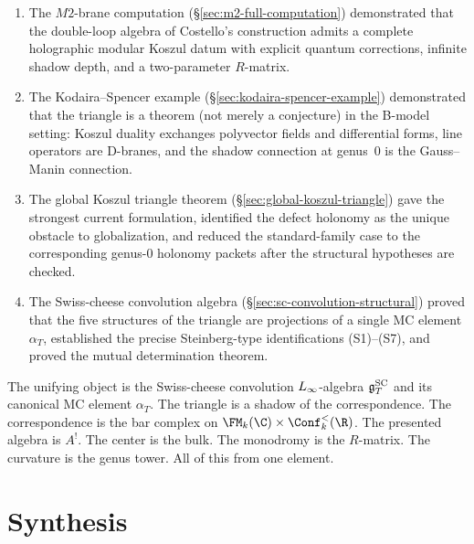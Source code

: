 \begin{enumerate}[label=(\arabic*),leftmargin=1.8em]
\item The $M2$-brane computation
(\S\ref{sec:m2-full-computation})
demonstrated that the double-loop algebra of Costello's
construction admits a complete holographic modular Koszul datum
with explicit quantum corrections, infinite shadow depth, and
a two-parameter $R$-matrix.

\item The Kodaira--Spencer example
(\S\ref{sec:kodaira-spencer-example})
demonstrated that the triangle is a theorem (not merely a
conjecture) in the B-model setting: Koszul duality exchanges
polyvector fields and differential forms, line operators are
D-branes, and the shadow connection at genus~$0$ is the
Gauss--Manin connection.

\item The global Koszul triangle theorem
(\S\ref{sec:global-koszul-triangle})
gave the strongest current formulation, identified the defect
holonomy as the unique obstacle to globalization, and reduced
the standard-family case to the corresponding genus-$0$
holonomy packets after the structural hypotheses are checked.

\item The Swiss-cheese convolution algebra
(\S\ref{sec:sc-convolution-structural})
proved that the five structures of the triangle are projections
of a single MC element $\alpha_T$, established the precise
Steinberg-type identifications (S1)--(S7), and proved the mutual
determination theorem.
\end{enumerate}

The unifying object is the Swiss-cheese convolution $L_\infty$-algebra
$\mathfrak{g}^{\mathrm{SC}}_T$ and its canonical MC element $\alpha_T$. The triangle
is a shadow of the correspondence. The correspondence is the
bar complex on $\FM_k(\C)\times\Conf_k^{<}(\R)$. The presented
algebra is $A^!$. The center is the bulk. The monodromy is the
$R$-matrix. The curvature is the genus tower. All of this from
one element.

\section{Synthesis}
\label{sec:ht-bbl-ext-supplement}

